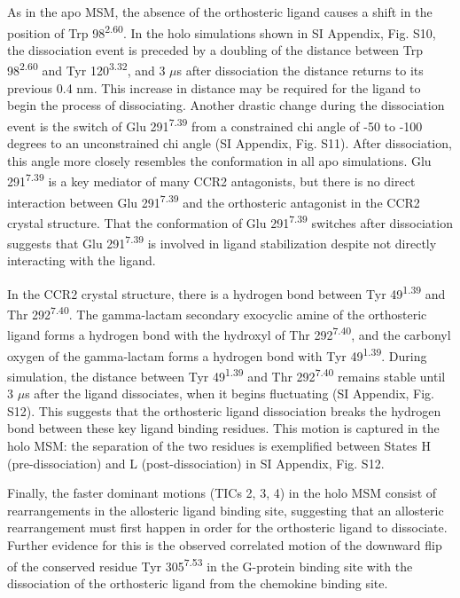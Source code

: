 As in the apo MSM, the absence of the orthosteric ligand causes a shift in the position of Trp 98\textsuperscript{2.60}.
In the holo simulations shown in SI Appendix, Fig. S10, the dissociation event is preceded by a doubling of the distance between Trp 98\textsuperscript{2.60} and Tyr 120\textsuperscript{3.32}, and 3 $\mu$s after dissociation the distance returns to its previous 0.4 nm.
This increase in distance may be required for the ligand to begin the process of dissociating.
Another drastic change during the dissociation event is the switch of Glu 291\textsuperscript{7.39} from a constrained chi angle of -50 to -100 degrees to an unconstrained chi angle (SI Appendix, Fig. S11).
After dissociation, this angle more closely resembles the conformation in all apo simulations.
Glu 291\textsuperscript{7.39} is a key mediator of many CCR2 antagonists\cite{Cherney2008}, but there is no direct interaction between Glu 291\textsuperscript{7.39} and the orthosteric antagonist in the CCR2 crystal structure\cite{Qin2015}.
That the conformation of Glu 291\textsuperscript{7.39} switches after dissociation suggests that Glu 291\textsuperscript{7.39} is involved in ligand stabilization despite not directly interacting with the ligand.

In the CCR2 crystal structure, there is a hydrogen bond between Tyr 49\textsuperscript{1.39} and Thr 292\textsuperscript{7.40}.
The gamma-lactam secondary exocyclic amine of the orthosteric ligand forms a hydrogen bond with the hydroxyl of Thr 292\textsuperscript{7.40}, and the carbonyl oxygen of the gamma-lactam forms a hydrogen bond with Tyr 49\textsuperscript{1.39}.
During simulation, the distance between Tyr 49\textsuperscript{1.39} and Thr 292\textsuperscript{7.40} remains stable until 3 $\mu$s after the ligand dissociates, when it begins fluctuating (SI Appendix, Fig. S12).
This suggests that the orthosteric ligand dissociation breaks the hydrogen bond between these key ligand binding residues.
This motion is captured in the holo MSM: the separation of the two residues is exemplified between States H (pre-dissociation) and L (post-dissociation) in SI Appendix, Fig. S12.

Finally, the faster dominant motions (TICs 2, 3, 4) in the holo MSM consist of rearrangements in the allosteric ligand binding site, suggesting that an allosteric rearrangement must first happen in order for the orthosteric ligand to dissociate.
Further evidence for this is the observed correlated motion of the downward flip of the conserved residue Tyr 305\textsuperscript{7.53} in the G-protein binding site with the dissociation of the orthosteric ligand from the chemokine binding site.

